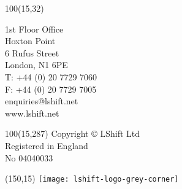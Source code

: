 \rfoot{\textcolor{LShiftBlue}{Technology from back to front}}
\textblockorigin{0mm}{0mm}
\setlength{\TPHorizModule}{1mm}
\setlength{\TPVertModule}{\TPHorizModule}


\begin{textblock}{100}(15,32)
  \begin{small}
    {\color{FrontPageGrey}
      \noindent1st Floor Office\\
      Hoxton Point\\
      6 Rufus Street\\
      London, N1 6PE\\

      \noindent T: +44 (0) 20 7729 7060\\
      F: +44 (0) 20 7729 7005\\
      enquiries@lshift.net\\
      www.lshift.net\\
    }
  \end{small}
\end{textblock}
\begin{textblock}{100}(15,287)
  \small \textcolor{FrontPageGrey}
  {Copyright © LShift Ltd \the\year\\
    Registered in England\\
    No 04040033}
\end{textblock}



\begin{textblock}{1}(150,15)
  \texttt{[image: lshift-logo-grey-corner]}
\end{textblock}


\rfoot{}

